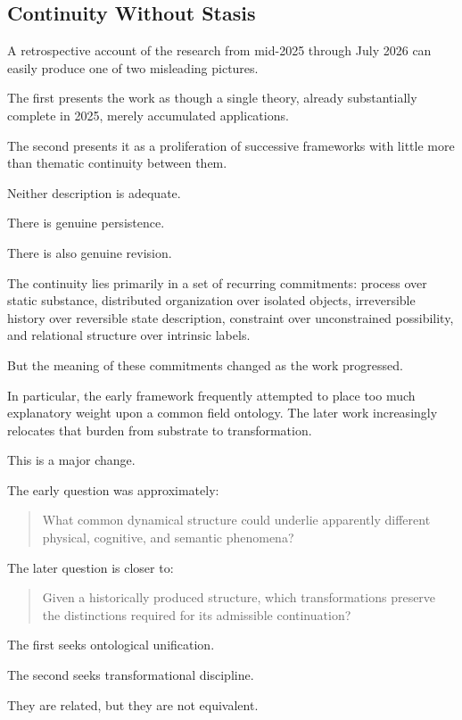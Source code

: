 \documentclass[11pt]{article}
\theoremstyle{remark}
\begin{document}
\subsection{Continuity Without Stasis}

A retrospective account of the research from mid-2025 through July 2026 can easily produce one of two misleading pictures.

The first presents the work as though a single theory, already substantially complete in 2025, merely accumulated applications.

The second presents it as a proliferation of successive frameworks with little more than thematic continuity between them.

Neither description is adequate.

There is genuine persistence.

There is also genuine revision.

The continuity lies primarily in a set of recurring commitments: process over static substance, distributed organization over isolated objects, irreversible history over reversible state description, constraint over unconstrained possibility, and relational structure over intrinsic labels.

But the meaning of these commitments changed as the work progressed.

In particular, the early framework frequently attempted to place too much explanatory weight upon a common field ontology. The later work increasingly relocates that burden from substrate to transformation.

This is a major change.

The early question was approximately:

\begin{quote}
What common dynamical structure could underlie apparently different physical, cognitive, and semantic phenomena?
\end{quote}

The later question is closer to:

\begin{quote}
Given a historically produced structure, which transformations preserve the distinctions required for its admissible continuation?
\end{quote}

The first seeks ontological unification.

The second seeks transformational discipline.

They are related, but they are not equivalent.
\end{document}

